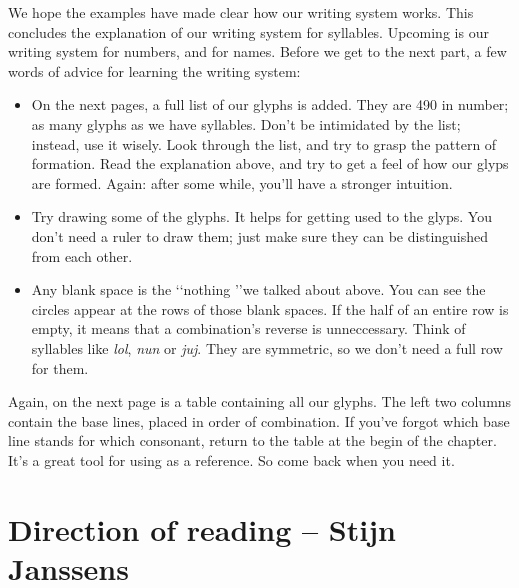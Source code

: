 We hope the examples have made clear how our writing system works. This concludes the explanation of our writing system for syllables. Upcoming is our writing system for numbers, and for names. Before we get to the next part, a few words of advice for learning the writing system:
\begin{itemize}
	\item On the next pages, a full list of our glyphs is added. They are 490 in number; as many glyphs as we have syllables. Don't be intimidated by the list; instead, use it wisely. Look through the list, and try to grasp the pattern of formation. Read the explanation above, and try to get a feel of how our glyps are formed. Again: after some while, you'll have a stronger intuition. 
	\item Try drawing some of the glyphs. It helps for getting used to the glyps. You don't need a ruler to draw them; just make sure they can be distinguished from each other. 
	\item Any blank space is the \lq\lq nothing \rq\rq we talked about above. You can see the circles appear at the rows of those blank spaces. If the half of an entire row is empty, it means that a combination's reverse is unneccessary. Think of syllables like {\it lol}, {\it nun} or {\it juj}. They are symmetric, so we don't need a full row for them. 
\end{itemize}

\noindent Again, on the next page is a table containing all our glyphs. The left two columns contain the base lines, placed in order of combination. If you've forgot which base line stands for which consonant, return to the table at the begin of the chapter. It's a great tool for using as a reference. So come back when you need it.  

\vfill

%
\pagebreak
{}
\pagebreak

\restoregeometry
\pagebreak
{}


\restoregeometry
\section{Direction of reading -- {\small Stijn Janssens}}

